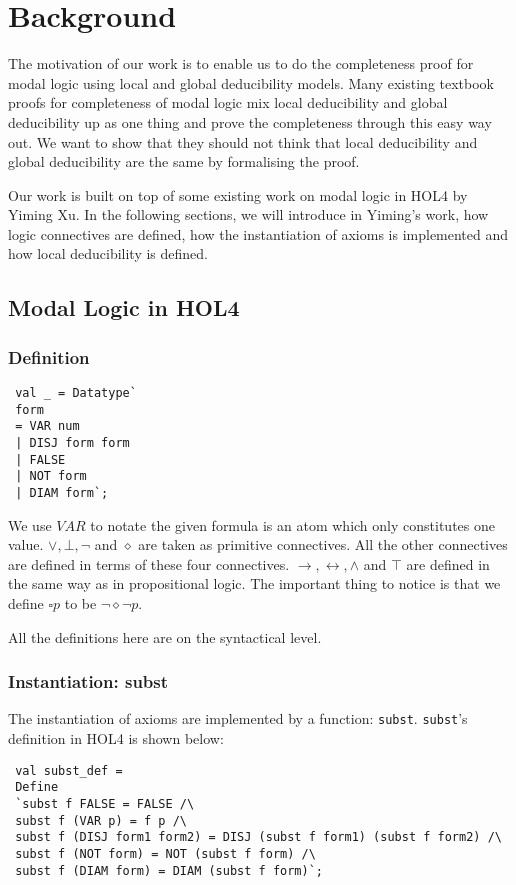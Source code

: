 \documentclass[submission,copyright,creativecommons]{eptcs}
\begin{document}
\section{Background}
The motivation of our work is to enable us to do the 
completeness proof for modal logic using local and global deducibility models. 
Many existing textbook proofs for completeness of modal logic mix 
local deducibility and global deducibility up as one thing and prove the completeness 
through this easy way out. We want to show that they should not 
think that local deducibility and global deducibility are the same by formalising 
the proof. 

Our work is built on top of some existing work on modal logic in HOL4\cite{yiming} by Yiming Xu.
In the following sections, we will introduce in Yiming's work, how logic connectives 
are defined, how the instantiation of axioms is implemented and how local 
deducibility is defined. 

\subsection{Modal Logic in HOL4}
\subsubsection{Definition}
\label{mldef}
\begin{verbatim}
 val _ = Datatype`
 form
 = VAR num
 | DISJ form form
 | FALSE
 | NOT form
 | DIAM form`;
\end{verbatim}
 
We use $VAR$ to notate the given formula is an atom which only 
constitutes one value. 
$\vee, \bot, \neg$ and $\diamond$ are taken as primitive connectives.
All the other connectives are defined in terms of these four connectives.
$\rightarrow, \leftrightarrow, \wedge$ and $\top$ are defined in the same way as 
in propositional logic. The important thing to notice is that we define 
$\square p$ to be $\neg \diamond \neg p$. 

All the definitions here are on the syntactical level. 


\subsubsection{Instantiation: subst}
The instantiation of axioms are implemented by a function: \texttt{subst}.
\texttt{subst}'s definition in HOL4 is shown below:
\begin{verbatim}
 val subst_def =
 Define
 `subst f FALSE = FALSE /\
 subst f (VAR p) = f p /\
 subst f (DISJ form1 form2) = DISJ (subst f form1) (subst f form2) /\
 subst f (NOT form) = NOT (subst f form) /\
 subst f (DIAM form) = DIAM (subst f form)`;
\end{verbatim}
\end{document}
